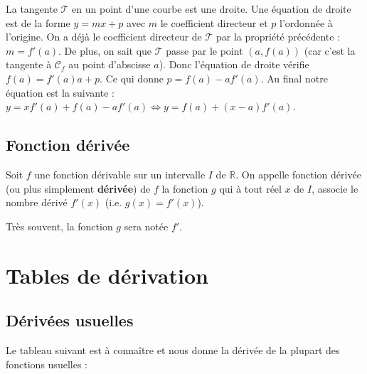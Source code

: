 	
	\begin{demonstration}
		La tangente $\mathcal{T}$ en un point d'une courbe est une droite. Une équation de droite est de la forme $y = mx + p$ avec $m$ le coefficient directeur et $p$ l'ordonnée à l'origine.
		\newpar
		On a déjà le coefficient directeur de $\mathcal{T}$ par la propriété précédente : $m = f'(a)$.
		\newpar
		De plus, on sait que $\mathcal{T}$ passe par le point $(a, f(a))$ (car c'est la tangente à $\mathcal{C}_f$ au point d'abscisse $a$).
		\newpar
		Donc l'équation de droite vérifie $f(a) = f'(a)a + p$. Ce qui donne $p = f(a) - af'(a)$.
		\newline
		Au final notre équation est la suivante : $y = xf'(a) + f(a) - af'(a) \iff y = f(a) + (x - a)f'(a)$.
	\end{demonstration}
	
	\subsection{Fonction dérivée}
	
	\begin{formula}[Définition]
		Soit $f$ une fonction dérivable sur un intervalle $I$ de $\mathbb{R}$.
		\newpar
		On appelle fonction dérivée (ou plus simplement \textbf{dérivée}) de $f$ la fonction $g$ qui à tout réel $x$ de $I$, associe le nombre dérivé $f'(x)$ (i.e. $g(x) = f'(x)$).
	\end{formula}
	
	Très souvent, la fonction $g$ sera notée $f'$.
	
	\section{Tables de dérivation}
	
	\subsection{Dérivées usuelles}
	
	Le tableau suivant est à connaître et nous donne la dérivée de la plupart des fonctions usuelles :
	
